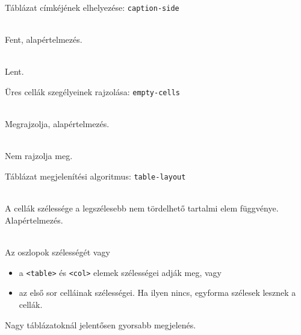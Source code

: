 \begin{frame}
  Táblázat címkéjének elhelyezése: \texttt{caption-side}
  \begin{description}[m]
    \item[\texttt{top}] \hfill \\ Fent, alapértelmezés.
    \item[\texttt{bottom}] \hfill \\ Lent.
  \end{description}
  \vfill
  Üres cellák szegélyeinek rajzolása: \texttt{empty-cells}
  \begin{description}[m]
    \item[\texttt{show}] \hfill \\ Megrajzolja, alapértelmezés.
    \item[\texttt{hide}] \hfill \\ Nem rajzolja meg.
  \end{description}
\end{frame}

\begin{frame}
  Táblázat megjelenítési algoritmus: \texttt{table-layout}
  \begin{description}[m]
    \item[\texttt{auto}] \hfill \\ A cellák szélessége a legszélesebb nem tördelhető tartalmi elem függvénye. Alapértelmezés.
    \item[\texttt{fixed}] \hfill \\ Az oszlopok szélességét vagy
    \begin{itemize}
      \item a \texttt{<table>} és \texttt{<col>} elemek szélességei adják meg, vagy
      \item az első sor celláinak szélességei. Ha ilyen nincs, egyforma szélesek lesznek a cellák.
    \end{itemize}
    Nagy táblázatoknál jelentősen gyorsabb megjelenés.
  \end{description}
\end{frame}

